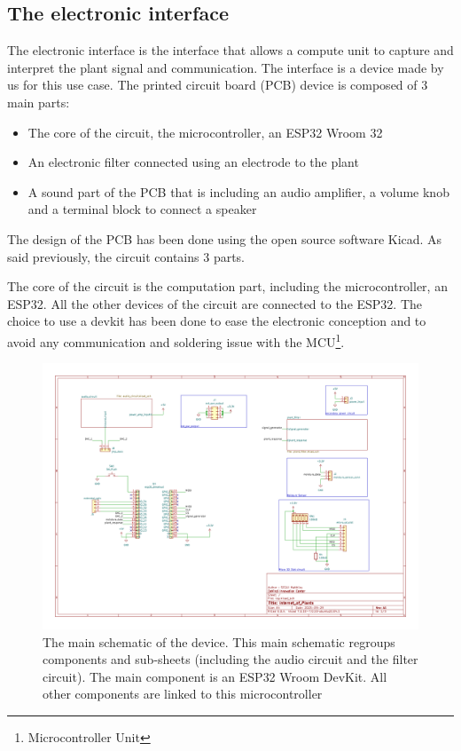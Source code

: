 \subsection{The electronic interface}

The electronic interface is the interface that allows a compute unit to capture and interpret the plant signal and
communication. The interface is a device made by us for this use case. The printed circuit board (PCB)
device is composed of 3 main parts:
\begin{itemize}
    \item The core of the circuit, the microcontroller, an ESP32 Wroom 32
    \item An electronic filter connected using an electrode to the plant
    \item A sound part of the PCB that is including an audio amplifier, a volume knob and a terminal block to connect a speaker
\end{itemize}

The design of the PCB has been done using the open source software Kicad.
As said previously, the circuit contains 3 parts.

The core of the circuit is the computation part, including the microcontroller, an ESP32. All the other
devices of the circuit are connected to the ESP32. The choice to use a devkit has been done
to ease the electronic conception and to avoid any communication and soldering issue with the MCU\footnote[1]{Microcontroller Unit}.

\begin{figure}[h!]
    \centering
    \includegraphics[width=\textwidth]{images/iop.pdf}
    \caption{The main schematic of the device. This main schematic regroups components and sub-sheets (including the audio circuit
        and the filter circuit). The main component is an ESP32 Wroom DevKit. All other components are linked to this microcontroller}
    \vspace{0.1cm}
    \label{fig:iop_schematic_main}
\end{figure}


